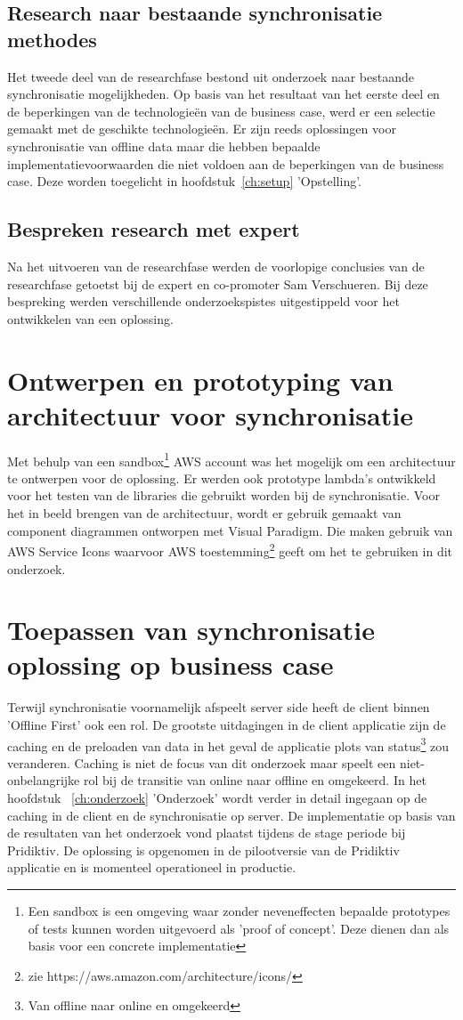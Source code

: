 \subsection{Research naar bestaande synchronisatie methodes}
Het tweede deel van de researchfase bestond uit onderzoek naar bestaande synchronisatie mogelijkheden. Op basis van het resultaat van het eerste deel en de beperkingen van de technologie\"en van de business case, werd er een selectie gemaakt met de geschikte technologie\"en. Er zijn reeds oplossingen voor synchronisatie van offline data maar die hebben bepaalde implementatievoorwaarden die niet voldoen aan de beperkingen van de business case. Deze worden toegelicht in hoofdstuk~\ref{ch:setup} 'Opstelling'.
\subsection{Bespreken research met expert}
Na het uitvoeren van de researchfase werden de voorlopige conclusies van de researchfase getoetst bij de expert en co-promoter Sam Verschueren. Bij deze bespreking werden verschillende onderzoekspistes uitgestippeld voor het ontwikkelen van een oplossing.
\section{Ontwerpen en prototyping van architectuur voor synchronisatie}
Met behulp van een sandbox\footnote{Een sandbox is een omgeving waar zonder neveneffecten bepaalde prototypes of tests kunnen worden uitgevoerd als 'proof of concept'. Deze dienen dan als basis voor een concrete implementatie} AWS account was het mogelijk om een architectuur te ontwerpen voor de oplossing. Er werden ook prototype lambda's ontwikkeld voor het testen van de libraries die gebruikt worden bij de synchronisatie. Voor het in beeld brengen van de architectuur, wordt er gebruik gemaakt van component diagrammen ontworpen met Visual Paradigm. Die maken gebruik van AWS Service Icons waarvoor AWS toestemming\footnote{zie https://aws.amazon.com/architecture/icons/} geeft om het te gebruiken in dit onderzoek.
\clearpage
\section{Toepassen van synchronisatie oplossing op business case}
Terwijl synchronisatie voornamelijk afspeelt server side heeft de client binnen 'Offline First' ook een rol. De grootste uitdagingen in de client applicatie zijn de caching en de preloaden van data in het geval de applicatie plots van status\footnote{Van offline naar online en omgekeerd} zou veranderen. Caching is niet de focus van dit onderzoek maar speelt een niet-onbelangrijke rol bij de transitie van online naar offline en omgekeerd. In het hoofdstuk ~\ref{ch:onderzoek} 'Onderzoek' wordt verder in detail ingegaan op de caching in de client en de synchronisatie op server. De implementatie op basis van de resultaten van het onderzoek vond plaatst tijdens de stage periode bij Pridiktiv. De oplossing is opgenomen in de pilootversie van de Pridiktiv applicatie en is momenteel operationeel in productie.
